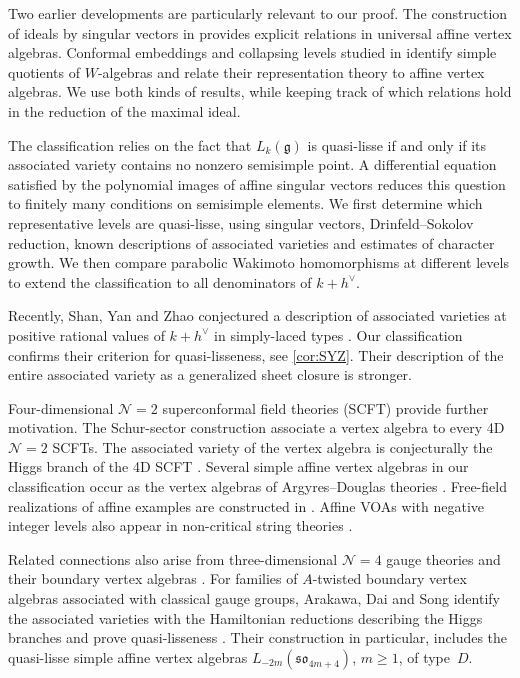 \documentclass[11pt,a4paper]{amsart}
\numberwithin{equation}{section}
\theoremstyle{definition}
\theoremstyle{remark}
\newcommand{\g}{\mathfrak g}
\begin{document}
Two earlier developments are particularly relevant to our proof.
The construction of ideals by singular vectors in
\cite{Adamovic2003} provides explicit relations in universal affine
vertex algebras. Conformal embeddings and collapsing levels studied in
\cite{AdamovicEtAl2018,AdamovicEtAl2017,AKMPP2020} identify simple quotients
of $W$-algebras and relate their representation theory to affine vertex
algebras. We use both kinds of results, while keeping track of which
relations hold in the reduction of the maximal ideal. 


The classification relies on the fact that $L_k(\g)$ is quasi-lisse if and only if its associated variety contains no nonzero semisimple point. A differential equation satisfied by the polynomial images of affine singular vectors reduces this question to finitely many conditions on semisimple elements. We first determine which representative levels are quasi-lisse, using singular vectors,
Drinfeld--Sokolov reduction, known descriptions of associated
varieties and estimates of character growth. We then compare
parabolic Wakimoto homomorphisms at different levels to extend
the classification to all denominators of $k+h^\vee$. 


Recently, Shan, Yan and Zhao conjectured a description of associated
varieties at positive rational values of $k+h^\vee$ in simply-laced types
\cite{ShanYanZhao2025,ShanYanZhao2026}. Our classification confirms their
criterion for quasi-lisseness, see \cref{cor:SYZ}. Their description of
the entire associated variety as a generalized sheet closure is stronger.

Four-dimensional $\mathcal N=2$ superconformal field theories (SCFT) provide further motivation. The Schur-sector construction \cite{BeemEtAl2015}
associate a vertex algebra to every 4D $\mathcal N=2$ SCFTs. The associated variety of the vertex algebra is conjecturally the Higgs branch of the 4D SCFT \cite{BeemRastelli2018}. Several simple affine vertex algebras in our classification occur
as the vertex algebras of Argyres--Douglas theories
\cite{XieYanYau2021,SongXieYan2017,WangXie2019,
XieYanLisse2021,LiXieYan2023}.
Free-field realizations of affine examples are constructed in
\cite{BeemMeneghelliRastelli2019}. 
Affine VOAs with negative integer levels also appear in non-critical string theories \cite{DZL,JaramilloKashaniPoor2023}.




Related connections also arise from three-dimensional $\mathcal N=4$ gauge theories and their boundary vertex algebras
\cite{Gai2019,CG2019,CCG2019,BF2025,BCDN2023,AFM2026}.
For families of $A$-twisted boundary vertex algebras associated
with classical gauge groups, Arakawa, Dai and Song identify the associated varieties with the Hamiltonian reductions describing the Higgs branches
and prove quasi-lisseness \cite[Section~6]{ArDS2026}. Their construction in particular, includes the quasi-lisse simple affine vertex algebras
$L_{-2m}(\mathfrak{so}_{4m+4})$, $m\ge1$, of type~$D$.
\end{document}
